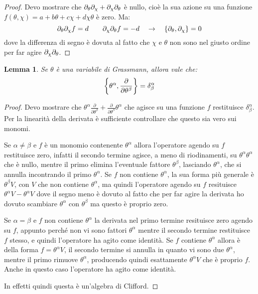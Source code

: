 \documentclass[]{scrartcl}
\newtheorem{lemma}{Lemma}
\begin{document}
\begin{proof}
  Devo mostrare che $ \partial_{\theta}\partial_{\chi} + \partial_{\chi}\partial_{\theta} $ è nullo, cioè la sua azione su una funzione
  $ f(\theta, \chi) = a + b \theta + c \chi + d \chi \theta$ è zero. Ma:
  \[
    \p{\theta}\p{\chi} f = d \qquad \p{\chi}\p{\theta} f = -d \quad \rightarrow \quad \acomm{\p{\theta}}{\p{\chi}} = 0
  \]
  dove la differenza di segno è dovuta al fatto che $ \chi $ e $ \theta $ non sono nel giusto ordine per far agire $ \partial_{\chi}\partial_{\theta} $.
\end{proof}

\begin{lemma}
  \label{lem:lemma3}
  Se $ \theta $ è una variabile di Grassmann, allora vale che:
  \[ \acomm{\theta^\alpha}{\frac{\partial}{\partial \theta^\beta}} = \delta^\alpha_\beta \]
\end{lemma}

\begin{proof}
  Devo mostrare che $ \theta^\alpha \frac{\partial}{\partial \theta^\beta} +  \frac{\partial}{\partial \theta^\beta} \theta^\alpha $ che
  agisce su una funzione $ f $ restituisce $ \delta^\alpha_\beta $. Per la linearità della derivata è sufficiente controllare che questo sia
  vero sui monomi.

  Se $ \alpha \not= \beta $ e $ f $ è un monomio contenente $ \theta^\alpha $ allora l'operatore agendo su $ f $ restituisce zero, infatti il secondo termine
  agisce, a meno di riodinamenti, su $ \theta^\alpha \theta^\alpha $ che è nullo, mentre il primo elimina l'eventuale fattore
  $ \theta^\beta $, lasciando $ \theta^\alpha $, che si annulla incontrando il primo $ \theta^\alpha $. Se $ f $ non contiene
  $ \theta^\alpha $, la sua forma più generale è $ \theta^\beta V $, con $ V $ che non contiene $ \theta^\alpha $, ma quindi l'operatore agendo su $ f $ resituisce
  $ \theta^\alpha V - \theta^\alpha V $ dove il segno meno è dovuto al fatto che per far agire la derivata ho dovuto scambiare $ \theta^\alpha $ con $ \theta^\beta $
  ma questo è proprio zero.

  Se $ \alpha = \beta $ e  $ f $ non contiene $ \theta^\alpha $ la derivata nel primo termine resituisce zero agendo su $ f $,
  appunto perché non vi sono fattori $ \theta^\alpha $ mentre il secondo termine restituisce $ f $ stesso, e quindi l'operatore
  ha agito come identità. Se $ f $ contiene $ \theta^\alpha $ allora è della forma $ f = \theta^\alpha V $, il secondo termine si annulla
  in quanto vi sono due $ \theta^\alpha $, mentre il primo rimuove $ \theta^\alpha $, producendo quindi esattamente $ \theta^\alpha V $ che è
  proprio $ f $. Anche in questo caso l'operatore ha agito come identità.

  In effetti quindi questa è un'algebra di Clifford.

\end{proof}
\end{document}
